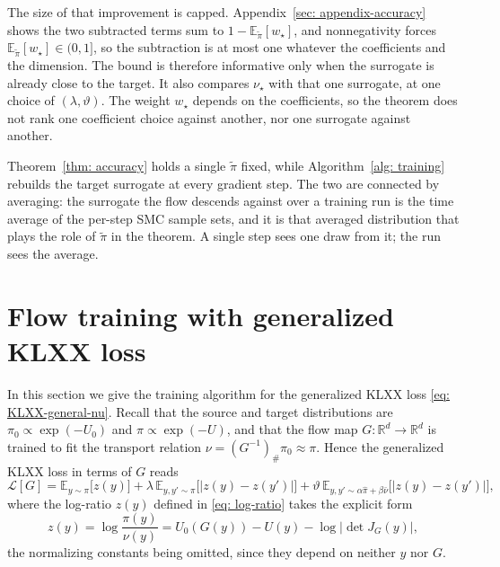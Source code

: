 \documentclass{article}
\begin{document}
{\color{blue}The size of that improvement is capped. Appendix~\ref{sec: appendix-accuracy} shows the two subtracted terms sum to $1-\mathbb E_{\tilde\pi}[w_\star]$, and nonnegativity forces $\mathbb E_{\tilde\pi}[w_\star]\in(0,1]$, so the subtraction is at most one whatever the coefficients and the dimension. The bound is therefore informative only when the surrogate is already close to the target. It also compares $\nu_\star$ with that one surrogate, at one choice of $(\lambda,\vartheta)$. The weight $w_\star$ depends on the coefficients, so the theorem does not rank one coefficient choice against another, nor one surrogate against another.}

{\color{blue}Theorem~\ref{thm: accuracy} holds a single $\tilde\pi$ fixed, while Algorithm~\ref{alg: training} rebuilds the target surrogate at every gradient step. The two are connected by averaging: the surrogate the flow descends against over a training run is the time average of the per-step SMC sample sets, and it is that averaged distribution that plays the role of $\tilde\pi$ in the theorem. A single step sees one draw from it; the run sees the average.}

\section{Flow training with generalized KLXX loss}
\label{sec: training}

In this section we give the training algorithm for the generalized KLXX loss \eqref{eq: KLXX-general-nu}. Recall that the source and target distributions are $\pi_0\propto \exp(-U_0)$ and $\pi\propto \exp(-U)$, and that the flow map $G:\mathbb R^d\to\mathbb R^d$ is trained to fit the transport relation $\nu=(G^{-1})_{\#}\pi_0\approx\pi$. Hence the generalized KLXX loss in terms of $G$ reads
\begin{equation}
	\mathcal L[G] = \mathbb E_{y\sim\pi}\big[z(y)\big] +  \lambda\, \mathbb E_{y,y'\sim\pi}\big[|z(y)-z(y')|\big] + \vartheta\, \mathbb E_{y,y'\sim \alpha\hat\pi+\beta\bar\nu}\big[|z(y)-z(y')|\big],
	\label{eq: KLXX-general}
\end{equation}
where the log-ratio $z(y)$ defined in \eqref{eq: log-ratio} takes the explicit form
\begin{equation*}
	z(y) = \log\frac{\pi(y)}{\nu(y)} = U_0(G(y)) - U(y) - \log|\det J_G(y)|,
\end{equation*}
the normalizing constants being omitted, since they depend on neither $y$ nor $G$.
\end{document}
